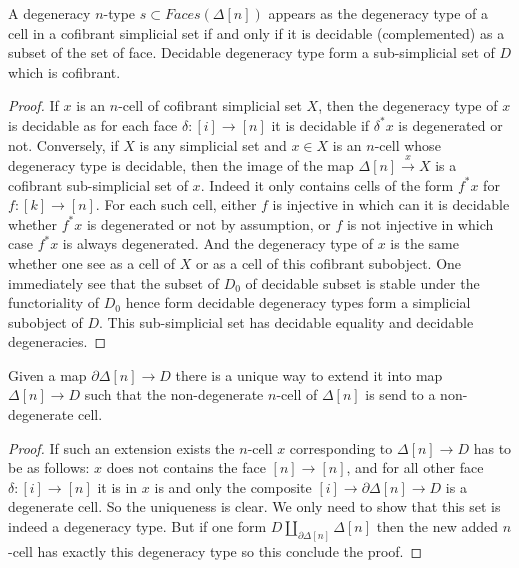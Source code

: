 \documentclass[reqno,10pt,a4paper,oneside,draft]{amsart}
\begin{document}
\begin{lemma}
A degeneracy $n$-type $s \subset Faces(\Delta[n])$ appears as the degeneracy type of a cell in a cofibrant simplicial set if and only if it is decidable (complemented) as a subset of the set of face. Decidable degeneracy type form a sub-simplicial set of $D$ which is cofibrant.
\end{lemma}

\begin{proof}
If $x$ is an $n$-cell of cofibrant simplicial set $X$, then the degeneracy type of $x$ is decidable as for each face $\delta:[i] \rightarrow [n]$ it is decidable if $\delta^* x $ is degenerated or not.
Conversely, if $X$ is any simplicial set and $x \in X$ is an $n$-cell whose degeneracy type is decidable, then the image of the map $\Delta[n] \overset{x}{\rightarrow} X$ is a cofibrant sub-simplicial set of $x$. Indeed it only contains cells of the form $f^*x$ for $f:[k] \rightarrow [n]$. For each such cell, either $f$ is injective in which can it is decidable whether $f^*x$ is degenerated or not by assumption, or $f$ is not injective in which case $f^*x$ is always degenerated. And the degeneracy type of $x$ is the same whether one see as a cell of $X$ or as a cell of this cofibrant subobject.
One immediately see that the subset of $D_0$ of decidable subset is stable under the functoriality of $D_0$ hence form decidable degeneracy types form a simplicial subobject of $D$. This sub-simplicial set has decidable equality and decidable degeneracies.
\end{proof}

\begin{lemma}

Given a map $\partial \Delta[n] \rightarrow D$ there is a unique way to extend it into map $\Delta[n] \rightarrow D$ such that the non-degenerate $n$-cell of $\Delta[n]$ is send to a non-degenerate cell.
\end{lemma}

\begin{proof}
If such an extension exists the $n$-cell $x$ corresponding to $\Delta[n] \rightarrow D$ has to be as follows: $x$ does not contains the face $[n] \rightarrow [n]$, and for all other face $\delta:[i] \rightarrow [n]$ it is in $x$ is and only the composite $[i] \rightarrow \partial \Delta[n] \rightarrow D$ is a degenerate cell. So the uniqueness is clear. We only need to show that this set is indeed a degeneracy type. But if one form $D \coprod_{\partial \Delta[n]} \Delta[n]$ then the new added $n$-cell has exactly this degeneracy type so this conclude the proof.
\end{proof}
\end{document}

